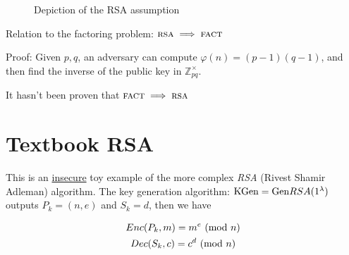 \begin{figure}[h!]
    \centering
    \sdinit{}
    \caption{Depiction of the RSA assumption}
    \label{fig:game_pke-rsa}
\end{figure}

Relation to the factoring problem: $\textsc{rsa} \implies \textsc{fact}$

Proof: Given $p, q$, an adversary can compute $\varphi(n) = (p-1)(q-1)$, and then find the inverse of the public key in $\mathbb{Z}_{pq}^\times$.

It hasn't been proven that $\textsc{fact} \implies \textsc{rsa}$









\section{Textbook RSA}
This is an \underline{insecure} toy example of the more complex \textit{RSA} (Rivest Shamir Adleman) algorithm.
The key generation algorithm: $\mathrm{KGen}=\mathrm{Gen} RSA(1^{\lambda})$ outputs $P_k=(n,e)$ and $S_k=d$, then we have

\begin{gather*}
    Enc(P_k,m)=m^e\ (\mathrm{mod}\ n)\\
    Dec(S_k,c)=c^d\ (\mathrm{mod}\ n)
\end{gather*}


